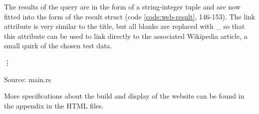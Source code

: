 The results of the query are in the form of a string-integer tuple and are now fitted into the form of the result struct (code \ref{code:web-result}, 146-153). The link attribute is very similar to the title, but all blanks are replaced with \_ so that this attribute can be used to link directly to the associated Wikipedia article, a small quirk of the chosen test data.
\begin{codeenv}
    \label{code:web-result}
    
    \vdots
    
    \centerline{Source: main.rs}
\end{codeenv}
More specifications about the build and display of the website can be found in the appendix in the \ac{HTML} files.